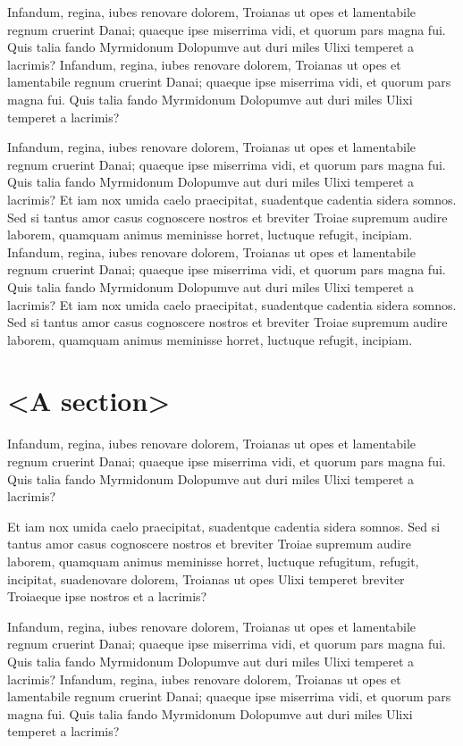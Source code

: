 \documentclass[
    ,final            %
  ]
  {aipproc}
\begin{document}
Infandum, regina, iubes renovare dolorem, Troianas ut opes et
lamentabile regnum cruerint Danai; quaeque ipse miserrima vidi, et
quorum pars magna fui. Quis talia fando Myrmidonum Dolopumve aut duri
miles Ulixi temperet a lacrimis?
Infandum, regina, iubes renovare dolorem, Troianas ut opes et
lamentabile regnum cruerint Danai; quaeque ipse miserrima vidi, et
quorum pars magna fui. Quis talia fando Myrmidonum Dolopumve aut duri
miles Ulixi temperet a lacrimis?

Infandum, regina, iubes renovare dolorem, Troianas ut opes et
lamentabile regnum cruerint Danai; quaeque ipse miserrima vidi, et
quorum pars magna fui. Quis talia fando Myrmidonum Dolopumve aut duri
miles Ulixi temperet a lacrimis? Et iam nox umida caelo praecipitat,
suadentque cadentia sidera somnos. Sed si tantus amor casus
\cite{Suykens2002} cognoscere nostros et breviter Troiae supremum
audire laborem, quamquam animus meminisse horret, luctuque refugit,
incipiam.  Infandum, regina, iubes renovare dolorem, Troianas ut opes
et lamentabile regnum cruerint Danai; quaeque ipse miserrima vidi, et
quorum pars magna fui. Quis talia fando Myrmidonum Dolopumve aut duri
miles Ulixi temperet a \cite{DeBrabanter2010} lacrimis? Et iam nox umida caelo
praecipitat, suadentque cadentia sidera somnos. Sed si tantus amor
casus cognoscere nostros et breviter Troiae supremum audire laborem,
quamquam animus meminisse horret, luctuque refugit, incipiam.

\section{<A section>}

Infandum, regina, iubes renovare dolorem, Troianas ut opes et
lamentabile regnum cruerint Danai; quaeque ipse miserrima vidi, et
quorum pars magna fui. Quis talia fando Myrmidonum Dolopumve aut duri
miles Ulixi temperet a lacrimis?

Et iam nox umida caelo praecipitat, suadentque cadentia sidera
somnos. Sed si tantus amor casus cognoscere nostros et breviter Troiae
supremum audire \cite{Suykens2002} laborem, quamquam animus meminisse
horret, luctuque refugitum, refugit, incipitat, suadenovare dolorem,
Troianas ut opes Ulixi temperet breviter Troiaeque ipse nostros et a
lacrimis?

Infandum, regina, iubes renovare dolorem, Troianas ut opes et
lamentabile regnum cruerint \cite{Brabanter2011} Danai; quaeque ipse
miserrima vidi, et quorum pars magna fui. Quis talia fando Myrmidonum
Dolopumve aut duri miles Ulixi temperet a lacrimis?  Infandum, regina,
iubes renovare dolorem, Troianas ut opes et lamentabile regnum
cruerint Danai; quaeque ipse miserrima vidi, et quorum pars magna
fui. Quis talia fando Myrmidonum Dolopumve aut duri miles Ulixi
temperet a lacrimis?
\end{document}
